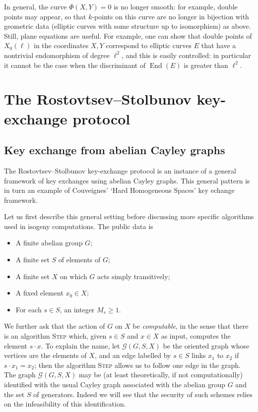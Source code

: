 \documentclass{article}
\newcommand{\Graph}{\mathcal{G}}
\newcommand{\algstyle}[1]{\textsc{#1}}
\theoremstyle{definition}
\DeclareMathOperator{\End}{End}
\begin{document}
In general, the curve $\Phi(X, Y) = 0$ is no longer smooth: for example, double 
points may appear, so that $k$-points on this curve are no longer in bijection 
with geometric data (elliptic curves with some structure up to isomorphism)
as above. Still, plane equations are useful. For example, 
one can show that double points of $X_0(\ell)$ in the coordinates $X, Y$ 
correspond to elliptic curves $E$ that have a nontrivial endomorphism of degree 
$\ell^2$, and this is easily controlled: in particular it cannot be the case
when the discriminant of $\End(E)$ is greater than $\ell^2$.


\section{The Rostovtsev--Stolbunov key-exchange protocol}
\label{sec:keyex}

\subsection{Key exchange from abelian Cayley graphs}

The Rostovtsev--Stolbunov key-exchange protocol is an instance of a general
framework of key exchanges using abelian Cayley graphs. This general pattern
is in turn an example of Couveignes' `Hard Homogeneous Spaces' key echange
framework.

Let us first describe this general
setting before discussing more specific algorithms used in isogeny computations.
The public data is
\begin{itemize}
\item A finite abelian group $G$;
\item A finite set $S$ of elements of $G$;
\item A finite set $X$ on which $G$ acts simply transitively;
\item A fixed element $x_0\in X$;
\item For each $s\in S$, an integer $M_s\geq 1$.
\end{itemize}
We further ask that the action of $G$ on $X$ be \emph{computable}, in the sense
 that there is an algorithm \algstyle{Step} which, given $s\in S$ and $x\in X$ as
input, computes the element $s\cdot x$. To explain the name, let $\Graph(G, S, X)$
be the oriented graph whose vertices are the elements of $X$, and an edge labelled
by $s\in S$ links $x_1$ to $x_2$ if $s\cdot x_1 = x_2$; then the algorithm
\algstyle{Step} allows us to follow one edge in the graph. The graph $\Graph(G, S, X)$
may be (at least theoretically, if not computationally) identified with the usual
Cayley graph associated with the abelian group $G$ and the set $S$ of generators.
Indeed we will see that the security of such schemes relies on the infeasibility
of this identification.
\end{document}

